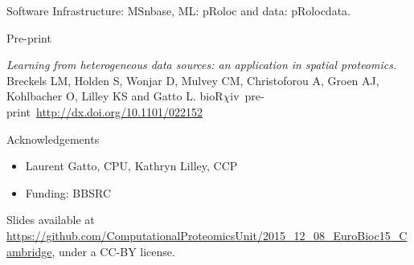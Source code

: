 \documentclass[bigger]{beamer}
\newcommand{\Rpackage}[1]{{\mbox{\normalfont\textsf{#1}}}}
\begin{document}
  \begin{frame}

   \begin{block}{Software}
     \vspace{.1cm}
    Infrastructure: \Rpackage{MSnbase}, ML: \Rpackage{pRoloc} and data: \Rpackage{pRolocdata}.
    \vspace{.2cm}
  \end{block}
   
  \begin{block}{Pre-print}
  \begin{small}
    \textit{Learning from heterogeneous data sources: an application
      in spatial proteomics.} Breckels LM, Holden S, Wonjar D, Mulvey
    CM, Christoforou A, Groen AJ, Kohlbacher O, Lilley KS and Gatto L.
    bioR$\chi$iv~pre-print~\url{http://dx.doi.org/10.1101/022152}
    \vspace{.2cm}
    \end{small}
  \end{block}
  
  \begin{block}{Acknowledgements}
    \begin{itemize}
    \item Laurent Gatto, CPU, Kathryn Lilley, CCP
    \item Funding: BBSRC
    \end{itemize}
  \end{block}
  
  \footnotesize {Slides available at
    \url{https://github.com/ComputationalProteomicsUnit/2015_12_08_EuroBioc15_Cambridge},
    under a CC-BY license}.
  
  \end{frame}
\end{document}
